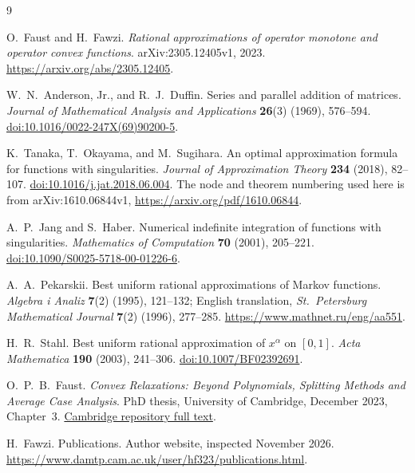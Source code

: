 \documentclass[11pt]{article}
\numberwithin{equation}{section}
\begin{document}
\begin{thebibliography}{9}\raggedright
{}
O.~Faust and H.~Fawzi.
\emph{Rational approximations of operator monotone and operator convex functions}.
arXiv:2305.12405v1, 2023.
\url{https://arxiv.org/abs/2305.12405}.

W.~N.~Anderson, Jr., and R.~J.~Duffin.
Series and parallel addition of matrices.
\emph{Journal of Mathematical Analysis and Applications}
\textbf{26}(3) (1969), 576--594.
\href{https://doi.org/10.1016/0022-247X(69)90200-5}{doi:10.1016/0022-247X(69)90200-5}.

K.~Tanaka, T.~Okayama, and M.~Sugihara.
An optimal approximation formula for functions with singularities.
\emph{Journal of Approximation Theory} \textbf{234} (2018), 82--107.
\href{https://doi.org/10.1016/j.jat.2018.06.004}{doi:10.1016/j.jat.2018.06.004}.
The node and theorem numbering used here is from arXiv:1610.06844v1,
\url{https://arxiv.org/pdf/1610.06844}.

A.~P.~Jang and S.~Haber.
Numerical indefinite integration of functions with singularities.
\emph{Mathematics of Computation} \textbf{70} (2001), 205--221.
\href{https://doi.org/10.1090/S0025-5718-00-01226-6}{doi:10.1090/S0025-5718-00-01226-6}.

A.~A.~Pekarskii.
Best uniform rational approximations of Markov functions.
\emph{Algebra i Analiz} \textbf{7}(2) (1995), 121--132;
English translation, \emph{St.~Petersburg Mathematical Journal}
\textbf{7}(2) (1996), 277--285.
\url{https://www.mathnet.ru/eng/aa551}.

H.~R.~Stahl.
Best uniform rational approximation of $x^\alpha$ on $[0,1]$.
\emph{Acta Mathematica} \textbf{190} (2003), 241--306.
\href{https://doi.org/10.1007/BF02392691}{doi:10.1007/BF02392691}.

O.~P.~B.~Faust.
\emph{Convex Relaxations: Beyond Polynomials, Splitting Methods and Average Case Analysis}.
PhD thesis, University of Cambridge, December 2023, Chapter~3.
\href{https://api.repository.cam.ac.uk/server/api/core/bitstreams/95b542c8-984c-45ca-bfee-e90bcad55a73/content}{Cambridge repository full text}.

H.~Fawzi. Publications. Author website, inspected November 2026.
\url{https://www.damtp.cam.ac.uk/user/hf323/publications.html}.
\end{thebibliography}
\end{document}
